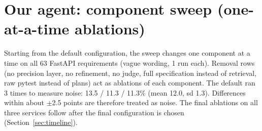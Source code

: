 \documentclass[11pt,a4paper]{article}
\begin{document}
\section{Our agent: component sweep (one-at-a-time ablations)}
Starting from the default configuration, the sweep changes one component at a time on all 63 FastAPI requirements (vague wording, 1 run each). Removal rows (no precision layer, no refinement, no judge, full specification instead of retrieval, raw pytest instead of plans) act as ablations of each component. The default ran 3 times to measure noise: 13.5 / 11.3 / 11.3\% (mean 12.0, sd 1.3). Differences within about $\pm$2.5 points are therefore treated as noise. The final ablations on all three services follow after the final configuration is chosen (Section~\ref{sec:timeline}).
\end{document}

